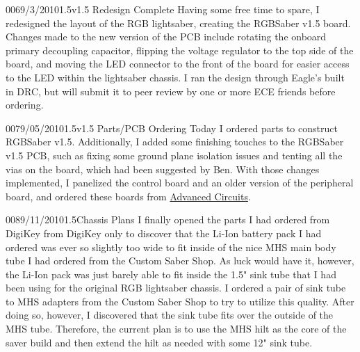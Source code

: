 \documentclass[12pt,letterpaper,onecolumn]{article}
\begin{document}
\begin{nbentry}{006}{9/3/2010}{1.5}{v1.5 Redesign Complete}
\indent Having some free time to spare, I redesigned the layout of the RGB lightsaber, creating the RGBSaber v1.5 board. Changes made to the new version of the PCB include rotating the onboard primary decoupling capacitor, flipping the voltage regulator to the top side of the board, and moving the LED connector to the front of the board for easier access to the LED within the lightsaber chassis. I ran the design through Eagle's built in DRC, but will submit it to peer review by one or more ECE friends before ordering.
\end{nbentry}

\begin{nbentry}{007}{9/05/2010}{1.5}{v1.5 Parts/PCB Ordering}
\indent Today I ordered parts to construct RGBSaber v1.5. Additionally, I added some finishing touches to the RGBSaber v1.5 PCB, such as fixing some ground plane isolation issues and tenting all the vias on the board, which had been suggested by Ben. With those changes implemented, I panelized the control board and an older version of the peripheral board, and ordered these boards from \href{http://www.4pcb.com}{Advanced Circuits}.
\end{nbentry}

\begin{nbentry}{008}{9/11/2010}{1.5}{Chassis Plans}
\indent I finally opened the parts I had ordered from DigiKey from DigiKey only to discover that the Li-Ion battery pack I had ordered was ever so slightly too wide to fit inside of the nice MHS main body tube I had ordered from the Custom Saber Shop. As luck would have it, however, the Li-Ion pack was just barely able to fit inside the 1.5" sink tube that I had been using for the original RGB lightsaber chassis. I ordered a pair of sink tube to MHS adapters from the Custom Saber Shop to try to utilize this quality. After doing so, however, I discovered that the sink tube fits over the outside of the MHS tube. Therefore, the current plan is to use the MHS hilt as the core of the saver build and then extend the hilt as needed with some 12" sink tube.
\end{nbentry}
\end{document}
